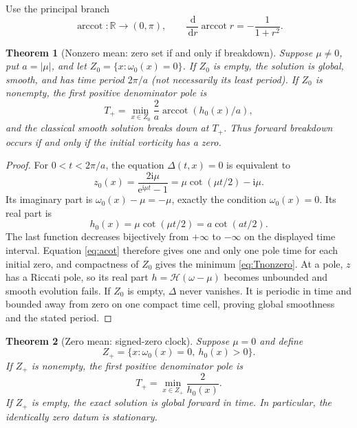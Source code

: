 \documentclass[10pt]{article}
\newcommand{\RR}{\mathbb R}
\newcommand{\e}{\mathrm e}
\newcommand{\ii}{\mathrm i}
\newcommand{\dd}{\,\mathrm d}
\newcommand{\HH}{\mathcal H}
\newcommand{\acot}{\operatorname{arccot}}
\newtheorem{theorem}{Theorem}
\begin{document}
Use the principal branch
\begin{equation}
 \acot:\RR\longrightarrow(0,\pi),\qquad
 \frac{\dd}{\dd r}\acot r=-\frac1{1+r^2}.        \label{eq:acot}
\end{equation}

\begin{theorem}[Nonzero mean: zero set if and only if breakdown]
\label{thm:nonzeroclock}
Suppose $\mu\ne0$, put $a=|\mu|$, and let
$Z_0=\{x:\omega_0(x)=0\}$.  If $Z_0$ is empty, the solution is global,
smooth, and has time period $2\pi/a$ (not necessarily its least period).
If $Z_0$ is nonempty, the first positive denominator pole is
\begin{equation}
 T_+=\min_{x\in Z_0}\frac2a
       \acot( h_0(x)/a ),                         \label{eq:Tnonzero}
\end{equation}
and the classical smooth solution breaks down at $T_+$.  Thus forward
breakdown occurs if and only if the initial vorticity has a zero.
\end{theorem}

\begin{proof}
For $0<t<2\pi/a$, the equation $\Delta(t,x)=0$ is equivalent to
\[
 z_0(x)=\frac{2\ii\mu}{\e^{\ii\mu t}-1}
       =\mu\cot(\mu t/2)-\ii\mu.
\]
Its imaginary part is $\omega_0(x)-\mu=-\mu$, exactly the condition
$\omega_0(x)=0$.  Its real part is
\[
 h_0(x)=\mu\cot(\mu t/2)=a\cot(at/2).
\]
The last function decreases bijectively from $+\infty$ to $-\infty$ on
the displayed time interval.  Equation \eqref{eq:acot} therefore gives one
and only one pole time for each initial zero, and compactness of $Z_0$
gives the minimum \eqref{eq:Tnonzero}.  At a pole, $z$ has a Riccati pole,
so its real part $h=\HH(\omega-\mu)$ becomes unbounded and smooth evolution
fails.  If $Z_0$ is empty, $\Delta$ never vanishes.  It is periodic in time
and bounded away from zero on one compact time cell, proving global
smoothness and the stated period.
\end{proof}

\begin{theorem}[Zero mean: signed-zero clock]\label{thm:zeroclock}
Suppose $\mu=0$ and define
\[
 Z_+=\{x:\omega_0(x)=0,\ h_0(x)>0\}.
\]
If $Z_+$ is nonempty, the first positive denominator pole is
\begin{equation}
 T_+=\min_{x\in Z_+}\frac{2}{h_0(x)}.             \label{eq:Tzero}
\end{equation}
If $Z_+$ is empty, the exact solution is global forward in time.  In
particular, the identically zero datum is stationary.
\end{theorem}
\end{document}
